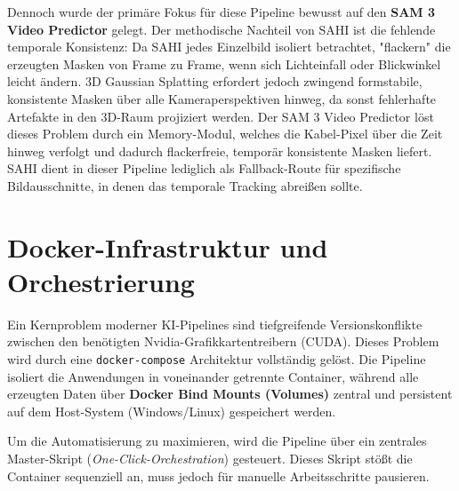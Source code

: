\documentclass[12pt,a4paper]{article}
\begin{document}
Dennoch wurde der primäre Fokus für diese Pipeline bewusst auf den \textbf{SAM 3 Video Predictor} gelegt. Der methodische Nachteil von SAHI ist die fehlende temporale Konsistenz: Da SAHI jedes Einzelbild isoliert betrachtet, "flackern" die erzeugten Masken von Frame zu Frame, wenn sich Lichteinfall oder Blickwinkel leicht ändern. 3D Gaussian Splatting erfordert jedoch zwingend formstabile, konsistente Masken über alle Kameraperspektiven hinweg, da sonst fehlerhafte Artefakte in den 3D-Raum projiziert werden. Der SAM 3 Video Predictor löst dieses Problem durch ein Memory-Modul, welches die Kabel-Pixel über die Zeit hinweg verfolgt und dadurch flackerfreie, temporär konsistente Masken liefert. SAHI dient in dieser Pipeline lediglich als Fallback-Route für spezifische Bildausschnitte, in denen das temporale Tracking abreißen sollte.


\section{Docker-Infrastruktur und Orchestrierung}
Ein Kernproblem moderner KI-Pipelines sind tiefgreifende Versionskonflikte zwischen den benötigten Nvidia-Grafikkartentreibern (CUDA). Dieses Problem wird durch eine \texttt{docker-compose} Architektur vollständig gelöst. Die Pipeline isoliert die Anwendungen in voneinander getrennte Container, während alle erzeugten Daten über \textbf{Docker Bind Mounts (Volumes)} zentral und persistent auf dem Host-System (Windows/Linux) gespeichert werden.

Um die Automatisierung zu maximieren, wird die Pipeline über ein zentrales Master-Skript (\textit{One-Click-Orchestration}) gesteuert. Dieses Skript stößt die Container sequenziell an, muss jedoch für manuelle Arbeitsschritte pausieren. 
\end{document}
